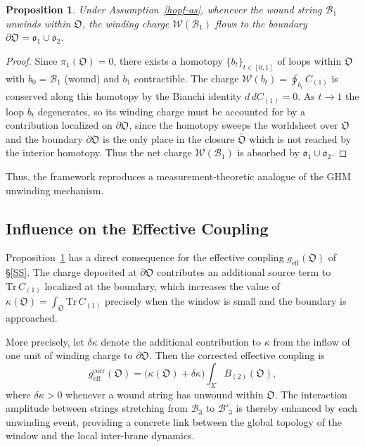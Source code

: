 \documentclass{article}
\newtheorem{pp}{Proposition}
\numberwithin{tm}{section}
\numberwithin{dn}{section}
\numberwithin{as}{section}
\numberwithin{rk}{section}
\numberwithin{lem}{section}
\numberwithin{ax}{section}
\numberwithin{pp}{section}
\numberwithin{eg}{section}
\numberwithin{war}{section}
\numberwithin{equation}{section}
\numberwithin{prop}{section}
\numberwithin{nt}{section}
\numberwithin{rc}{section}
\numberwithin{setup}{section}
\begin{document}
\begin{pp} \label{inflow}
	Under Assumption~\ref{hopf-as}, whenever the wound string $\mathcal{B}_1$ unwinds within $\mathfrak{O}$, the winding charge $\mathcal{W}(\mathcal{B}_1)$ flows to the boundary $\partial\mathfrak{O} = \mathfrak{o}_1 \cup \mathfrak{o}_2$.
\end{pp}

\begin{proof}
	Since $\pi_1(\mathfrak{O})=0$, there exists a homotopy $\{b_t\}_{t\in[0,1]}$ of loops within $\mathfrak{O}$ with $b_0 = \mathcal{B}_1$ (wound) and $b_1$ contractible. The charge $\mathcal{W}(b_t) = \oint_{b_t} C_{(1)}$ is conserved along this homotopy by the Bianchi identity $d\,dC_{(1)} = 0$. As $t \to 1$ the loop $b_t$ degenerates, so its winding charge must be accounted for by a contribution localized on $\partial \mathfrak{O}$, since the homotopy sweeps the worldsheet over $\mathfrak{O}$ and the boundary $\partial\mathfrak{O}$ is the only place in the closure $\overline{\mathfrak{O}}$ which is not reached by the interior homotopy. Thus the net charge $\mathcal{W}(\mathcal{B}_1)$ is absorbed by $\mathfrak{o}_1 \cup \mathfrak{o}_2$.
\end{proof}

Thus, the framework reproduces a measurement-theoretic analogue of the GHM unwinding mechanism.

\subsection{Influence on the Effective Coupling}

Proposition~\ref{inflow} has a direct consequence for the effective coupling $g_{\mathrm{eff}}(\mathfrak{O})$ of \S\ref{SS}. The charge deposited at $\partial\mathfrak{O}$ contributes an additional source term to $\mathrm{Tr}\, C_{(1)}$ localized at the boundary, which increases the value of $\kappa(\mathfrak{O}) = \int_{\mathfrak{O}} \mathrm{Tr}\, C_{(1)}$ precisely when the window is small and the boundary is approached.

More precisely, let $\delta\kappa$ denote the additional contribution to $\kappa$ from the inflow of one unit of winding charge to $\partial\mathfrak{O}$. Then the corrected effective coupling is
\begin{equation} \label{corrected-geff}
	g_{\mathrm{eff}}^{\mathrm{corr}}(\mathfrak{O}) = \bigl(\kappa(\mathfrak{O}) + \delta\kappa\bigr) \int_\Sigma B_{(2)}(\mathfrak{O}),
\end{equation}
where $\delta\kappa > 0$ whenever a wound string has unwound within $\mathfrak{O}$. The interaction amplitude between strings stretching from $\mathcal{B}_3$ to $\mathcal{B}'_3$ is thereby enhanced by each unwinding event, providing a concrete link between the global topology of the window and the local inter-brane dynamics.
\end{document}
